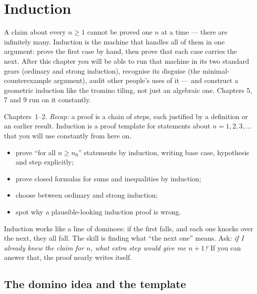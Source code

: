 \chapter{Induction}\label{ch:induction}

A claim about every $n \ge 1$ cannot be proved one $n$ at a time --- there are
infinitely many. Induction is the machine that handles all of them in one
argument: prove the first case by hand, then prove that each case carries the
next. After this chapter you will be able to run that machine in its two
standard gears (ordinary and strong induction), recognise its disguise
(the minimal-counterexample argument), audit other people's uses of it ---
and construct a geometric induction like the tromino tiling, not just an
algebraic one. Chapters 5, 7 and 9 run on it constantly.

\begin{rulebox}
Chapters~1--2. \emph{Recap:} a proof is a chain of steps, each justified by a definition or an earlier result. Induction is a proof template for statements about $n=1,2,3,\dots$ that you will use constantly from here on.
\end{rulebox}
\begin{wins}
\begin{itemize}
\item prove ``for all $n\ge n_0$'' statements by induction, writing base case, hypothesis and step explicitly;
\item prove closed formulas for sums and inequalities by induction;
\item choose between ordinary and strong induction;
\item spot why a plausible-looking induction proof is wrong.
\end{itemize}
\end{wins}
\begin{principle}
Induction works like a line of dominoes: if the first falls, and each one knocks over the next, they all fall. The skill is finding what ``the next one'' means. Ask: \emph{if I already knew the claim for $n$, what extra step would give me $n+1$?} If you can answer that, the proof nearly writes itself.
\end{principle}

\section{The domino idea and the template}\label{sec:domino}

